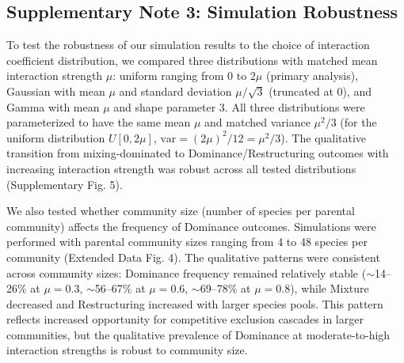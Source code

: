 \subsection*{Supplementary Note 3: Simulation Robustness}
\label{sec:suppl:note3}

To test the robustness of our simulation results to the choice of interaction coefficient distribution, we compared three distributions with matched mean interaction strength $\mu$: uniform ranging from 0 to $2\mu$ (primary analysis), Gaussian with mean $\mu$ and standard deviation $\mu/\sqrt{3}$ (truncated at 0), and Gamma with mean $\mu$ and shape parameter 3. All three distributions were parameterized to have the same mean $\mu$ and matched variance $\mu^2/3$ (for the uniform distribution $U[0, 2\mu]$, $\text{var} = (2\mu)^2/12 = \mu^2/3$). The qualitative transition from mixing-dominated to Dominance/Restructuring outcomes with increasing interaction strength was robust across all tested distributions (Supplementary Fig. 5).

We also tested whether community size (number of species per parental community) affects the frequency of Dominance outcomes. Simulations were performed with parental community sizes ranging from 4 to 48 species per community (Extended Data Fig. 4). The qualitative patterns were consistent across community sizes: Dominance frequency remained relatively stable ($\sim$14--26\% at $\mu=0.3$, $\sim$56--67\% at $\mu=0.6$, $\sim$69--78\% at $\mu=0.8$), while Mixture decreased and Restructuring increased with larger species pools. This pattern reflects increased opportunity for competitive exclusion cascades in larger communities, but the qualitative prevalence of Dominance at moderate-to-high interaction strengths is robust to community size.

